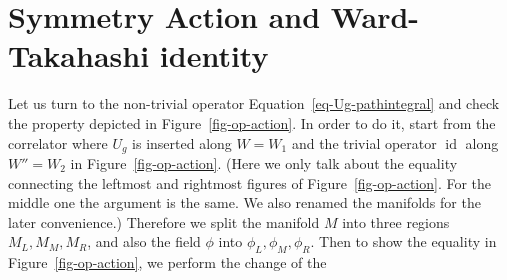 \documentclass[
  letterpaper,
  DIV=11,
  numbers=noendperiod]{scrreport}
\DeclareMathOperator{\id}{id}
\begin{document}
\section{Symmetry Action and Ward-Takahashi
identity}\label{symmetry-action-and-ward-takahashi-identity}

Let us turn to the non-trivial operator
Equation~\ref{eq-Ug-pathintegral} and check the property depicted in
Figure~\ref{fig-op-action}. In order to do it, start from the correlator
where \(U_g\) is inserted along \(W=W_1\) and the trivial operator
\(\id\) along \(W''=W_2\) in Figure~\ref{fig-op-action}. (Here we only
talk about the equality connecting the leftmost and rightmost figures of
Figure~\ref{fig-op-action}. For the middle one the argument is the same.
We also renamed the manifolds for the later convenience.) Therefore we
split the manifold \(M\) into three regions \(M_L,M_M,M_R\), and also
the field \(\phi\) into \(\phi_L,\phi_M,\phi_R\). Then to show the
equality in Figure~\ref{fig-op-action}, we perform the change of the
\end{document}

